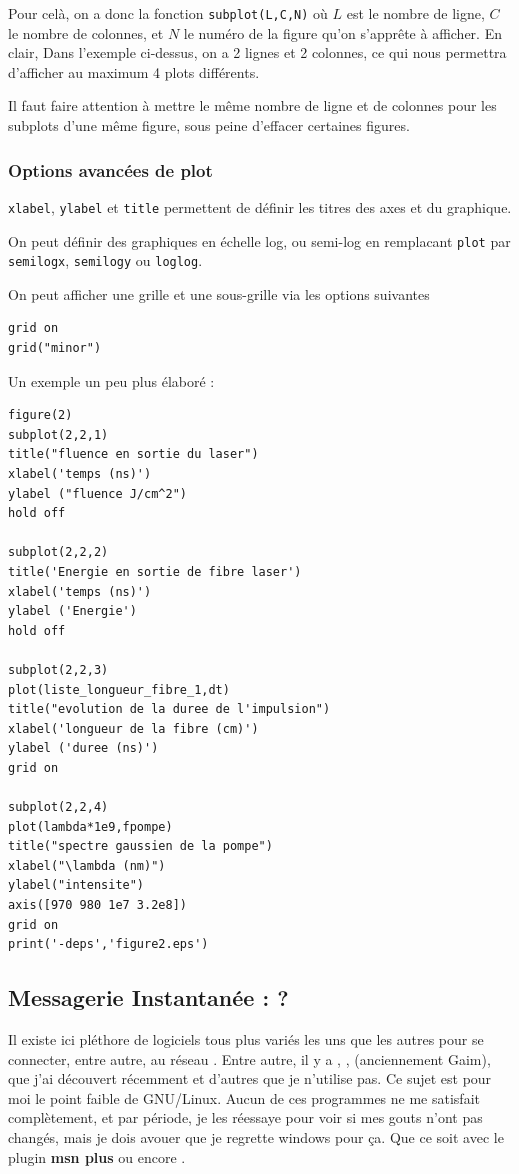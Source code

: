 \documentclass[a4paper,twoside]{article}
\begin{document}
Pour celà, on a donc la fonction \verb|subplot(L,C,N)| où $L$ est le nombre de ligne, $C$ le nombre de colonnes, et $N$ le numéro de la figure qu'on s'apprête à afficher. En clair, Dans l'exemple ci-dessus, on a 2 lignes et 2 colonnes, ce qui nous permettra d'afficher au maximum 4 plots différents.

\begin{attention}
Il faut faire attention à mettre le même nombre de ligne et de colonnes pour les subplots d'une même figure, sous peine d'effacer certaines figures.
\end{attention}

\subsubsection{Options avancées de plot}
\texttt{xlabel}, \texttt{ylabel} et \texttt{title} permettent de définir les titres des axes et du graphique.

On peut définir des graphiques en échelle log, ou semi-log en remplacant \texttt{plot} par \texttt{semilogx}, \texttt{semilogy} ou \texttt{loglog}.

On peut afficher une grille et une sous-grille via les options suivantes
\begin{verbatim}
grid on
grid("minor")
\end{verbatim}

Un exemple un peu plus élaboré :
\begin{verbatim}
figure(2)
subplot(2,2,1)
title("fluence en sortie du laser")
xlabel('temps (ns)')
ylabel ("fluence J/cm^2")
hold off

subplot(2,2,2)
title('Energie en sortie de fibre laser')
xlabel('temps (ns)')
ylabel ('Energie')
hold off

subplot(2,2,3)
plot(liste_longueur_fibre_1,dt)
title("evolution de la duree de l'impulsion")
xlabel('longueur de la fibre (cm)')
ylabel ('duree (ns)')
grid on

subplot(2,2,4)
plot(lambda*1e9,fpompe)
title("spectre gaussien de la pompe")
xlabel("\lambda (nm)")
ylabel("intensite")
axis([970 980 1e7 3.2e8])
grid on
print('-deps','figure2.eps')
\end{verbatim}



\subsection{Messagerie Instantanée : ?}
Il existe ici pléthore de logiciels tous plus variés les uns que les autres pour se connecter, entre autre, au réseau . Entre autre, il y a , ,  (anciennement Gaim),  que j'ai découvert récemment et d'autres que je n'utilise pas. Ce sujet est pour moi le point faible de GNU/Linux. Aucun de ces programmes ne me satisfait complètement, et par période, je les réessaye pour voir si mes gouts n'ont pas changés, mais je dois avouer que je regrette windows pour ça. Que ce soit  avec le plugin \textbf{msn plus} ou encore .
\end{document}
